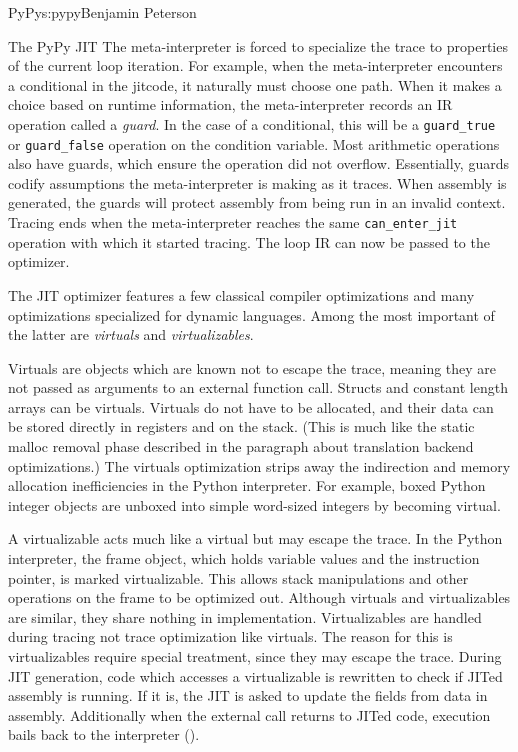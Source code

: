 \begin{aosachapter}{PyPy}{s:pypy}{Benjamin Peterson}
\begin{aosasect1}{The PyPy JIT}
The meta-interpreter is forced to specialize the trace to properties of the
current loop iteration. For example, when the meta-interpreter encounters a
conditional in the jitcode, it naturally must choose one path. When it makes a
choice based on runtime information, the meta-interpreter records an IR
operation called a \emph{guard}. In the case of a conditional, this will be a
\verb+guard_true+ or \verb+guard_false+ operation on the condition
variable. Most arithmetic operations also have guards, which ensure the
operation did not overflow. Essentially, guards codify assumptions the
meta-interpreter is making as it traces. When assembly is generated, the guards
will protect assembly from being run in an invalid context. Tracing ends when
the meta-interpreter reaches the same \verb+can_enter_jit+ operation with which
it started tracing. The loop IR can now be passed to the optimizer.

The JIT optimizer features a few classical compiler optimizations and many
optimizations specialized for dynamic languages. Among the most important of the
latter are \emph{virtuals} and \emph{virtualizables}.

Virtuals are objects which are known not to escape the trace, meaning they are
not passed as arguments to an external function call. Structs and constant
length arrays can be virtuals. Virtuals do not have to be allocated, and their
data can be stored directly in registers and on the stack. (This is much like
the static malloc removal phase described in the paragraph about translation
backend optimizations.) The virtuals optimization strips away the indirection
and memory allocation inefficiencies in the Python interpreter. For example,
boxed Python integer objects are unboxed into simple word-sized integers by
becoming virtual.

A virtualizable acts much like a virtual but may escape the
trace. In the Python interpreter, the frame object, which holds variable values
and the instruction pointer, is marked virtualizable. This allows stack
manipulations and other operations on the frame to be optimized out. Although
virtuals and virtualizables are similar, they share nothing in
implementation. Virtualizables are handled during tracing not trace optimization
like virtuals. The reason for this is virtualizables require special treatment,
since they may escape the trace. During JIT generation, code which accesses a
virtualizable is rewritten to check if JITed assembly is running. If it is, the
JIT is asked to update the fields from data in assembly. Additionally when the
external call returns to JITed code, execution bails back to the interpreter
().


\end{aosasect1}
\end{aosachapter}
